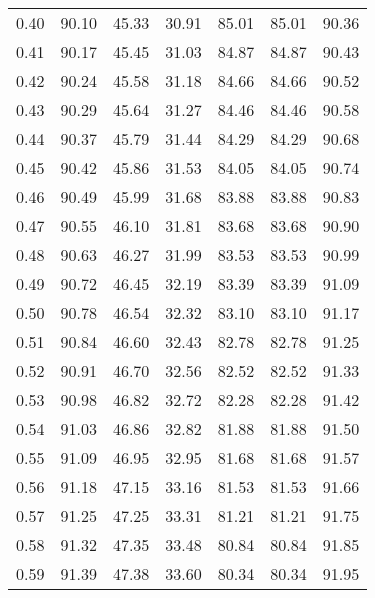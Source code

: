 \begin{tabular}{|c|c|c|c|c|c|c|}
      0.40 &     90.10 &     45.33 &      30.91 &   85.01 &      85.01 &         90.36 \\
      0.41 &     90.17 &     45.45 &      31.03 &   84.87 &      84.87 &         90.43 \\
      0.42 &     90.24 &     45.58 &      31.18 &   84.66 &      84.66 &         90.52 \\
      0.43 &     90.29 &     45.64 &      31.27 &   84.46 &      84.46 &         90.58 \\
      0.44 &     90.37 &     45.79 &      31.44 &   84.29 &      84.29 &         90.68 \\
      0.45 &     90.42 &     45.86 &      31.53 &   84.05 &      84.05 &         90.74 \\
      0.46 &     90.49 &     45.99 &      31.68 &   83.88 &      83.88 &         90.83 \\
      0.47 &     90.55 &     46.10 &      31.81 &   83.68 &      83.68 &         90.90 \\
      0.48 &     90.63 &     46.27 &      31.99 &   83.53 &      83.53 &         90.99 \\
      0.49 &     90.72 &     46.45 &      32.19 &   83.39 &      83.39 &         91.09 \\
      0.50 &     90.78 &     46.54 &      32.32 &   83.10 &      83.10 &         91.17 \\
      0.51 &     90.84 &     46.60 &      32.43 &   82.78 &      82.78 &         91.25 \\
      0.52 &     90.91 &     46.70 &      32.56 &   82.52 &      82.52 &         91.33 \\
      0.53 &     90.98 &     46.82 &      32.72 &   82.28 &      82.28 &         91.42 \\
      0.54 &     91.03 &     46.86 &      32.82 &   81.88 &      81.88 &         91.50 \\
      0.55 &     91.09 &     46.95 &      32.95 &   81.68 &      81.68 &         91.57 \\
      0.56 &     91.18 &     47.15 &      33.16 &   81.53 &      81.53 &         91.66 \\
      0.57 &     91.25 &     47.25 &      33.31 &   81.21 &      81.21 &         91.75 \\
      0.58 &     91.32 &     47.35 &      33.48 &   80.84 &      80.84 &         91.85 \\
      0.59 &     91.39 &     47.38 &      33.60 &   80.34 &      80.34 &         91.95 \\

\end{tabular}

